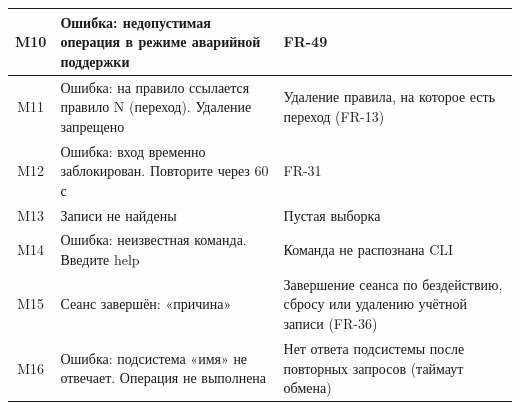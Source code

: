 \documentclass[13pt,a4paper,final]{article}
\begin{document}
\begin{xltabular}{\textwidth}{|c|X|X|}
		\hline
		M10 & Ошибка: недопустимая операция в режиме аварийной поддержки & FR-49 \\
		\hline
		M11 & Ошибка: на правило ссылается правило N (переход). Удаление запрещено & Удаление правила, на которое есть переход {(FR-13)} \\
		\hline
		M12 & Ошибка: вход временно заблокирован. Повторите через 60 с & FR-31 \\
		\hline
		M13 & Записи не найдены & Пустая выборка \\
		\hline
		M14 & Ошибка: неизвестная команда. Введите help & Команда не распознана CLI \\
		\hline
		M15 & Сеанс завершён: «причина» & Завершение сеанса по бездействию, сбросу или удалению учётной записи (FR-36) \\
		\hline
		\textcolor{edit}{M16} & \textcolor{edit}{Ошибка: подсистема «имя» не отвечает. Операция не выполнена} & \textcolor{edit}{Нет ответа подсистемы после повторных запросов (таймаут обмена)} \\
		\hline
	\end{xltabular}
	
\end{document}
